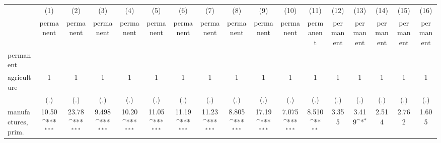 {
\def\sym#1{\ifmmode^{#1}\else\(^{#1}\)\fi}
\begin{tabular}{l*{16}{c}}
\hline\hline
                    &\multicolumn{1}{c}{(1)}&\multicolumn{1}{c}{(2)}&\multicolumn{1}{c}{(3)}&\multicolumn{1}{c}{(4)}&\multicolumn{1}{c}{(5)}&\multicolumn{1}{c}{(6)}&\multicolumn{1}{c}{(7)}&\multicolumn{1}{c}{(8)}&\multicolumn{1}{c}{(9)}&\multicolumn{1}{c}{(10)}&\multicolumn{1}{c}{(11)}&\multicolumn{1}{c}{(12)}&\multicolumn{1}{c}{(13)}&\multicolumn{1}{c}{(14)}&\multicolumn{1}{c}{(15)}&\multicolumn{1}{c}{(16)}\\
                    &\multicolumn{1}{c}{permanent}&\multicolumn{1}{c}{permanent}&\multicolumn{1}{c}{permanent}&\multicolumn{1}{c}{permanent}&\multicolumn{1}{c}{permanent}&\multicolumn{1}{c}{permanent}&\multicolumn{1}{c}{permanent}&\multicolumn{1}{c}{permanent}&\multicolumn{1}{c}{permanent}&\multicolumn{1}{c}{permanent}&\multicolumn{1}{c}{permanent}&\multicolumn{1}{c}{permanent}&\multicolumn{1}{c}{permanent}&\multicolumn{1}{c}{permanent}&\multicolumn{1}{c}{permanent}&\multicolumn{1}{c}{permanent}\\
\hline
permanent           &                     &                     &                     &                     &                     &                     &                     &                     &                     &                     &                     &                     &                     &                     &                     &                     \\
agriculture         &           1         &           1         &           1         &           1         &           1         &           1         &           1         &           1         &           1         &           1         &           1         &           1         &           1         &           1         &           1         &           1         \\
                    &         (.)         &         (.)         &         (.)         &         (.)         &         (.)         &         (.)         &         (.)         &         (.)         &         (.)         &         (.)         &         (.)         &         (.)         &         (.)         &         (.)         &         (.)         &         (.)         \\
[1em]
manufactures, prim. &       10.50\sym{***}&       23.78\sym{***}&       9.498\sym{***}&       10.20\sym{***}&       11.05\sym{***}&       11.19\sym{***}&       11.23\sym{***}&       8.805\sym{***}&       17.19\sym{***}&       7.075\sym{***}&       8.510\sym{**} &       3.355         &       3.419\sym{*}  &       2.514         &       2.762         &       1.605         \\

\end{tabular}}
